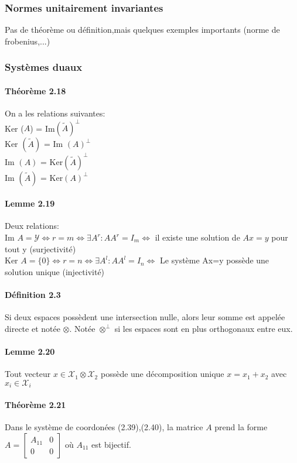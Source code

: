 \subsubsection{Normes unitairement invariantes}
Pas de théorème ou définition,mais quelques exemples importants (norme de frobenius,...)

\subsubsection{Systèmes duaux}

\paragraph{Théorème 2.18}On a les relations suivantes:\\
Ker ($A$) = Im$\left(\tilde{A}\right)^\perp$\\
Ker $\left(\tilde{A}\right)$ = Im $(A)^\perp$\\
Im $(A)$ = Ker$\left(\tilde{A}\right)^\perp$\\
Im $\left(\tilde{A}\right)$ = Ker$(A)^\perp$

\paragraph{Lemme 2.19} Deux relations:\\
Im $A = \mathcal{Y} \Leftrightarrow r = m\Leftrightarrow \exists A^r:AA^r = I_m \Leftrightarrow$ il existe une solution de $Ax=y$ pour tout y (surjectivité)\\
Ker $A = \{0\} \Leftrightarrow r=n \Leftrightarrow \exists A^l : AA^l = I_n \Leftrightarrow $ Le système Ax=y possède une solution unique (injectivité)

\paragraph{Définition 2.3} Si deux espaces possèdent une intersection nulle, alors leur somme est appelée directe et notée $\otimes$. Notée $\otimes^\perp$ si les espaces sont en plus orthogonaux entre eux.

\paragraph{Lemme 2.20} Tout vecteur $x \in \mathcal{X}_1 \otimes \mathcal{X}_2$ possède une décomposition unique $x = x_1 + x_2$ avec $x_i \in \mathcal{X}_i$

\paragraph{Théorème 2.21} Dans le système de coordonées (2.39),(2.40), la matrice $A$ prend la forme $A = \begin{bmatrix}
A_{11} & 0 \\
0 & 0
\end{bmatrix} $ où $A_{11}$ est bijectif.

